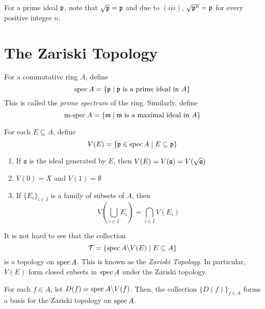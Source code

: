 For a prime ideal $\mathfrak p$, note that $\sqrt{\mathfrak p} = \mathfrak p$ and due to $(iii)$, $\sqrt{\mathfrak p^n} = \mathfrak p$ for every positive integer $n$. 

\section{The Zariski Topology}

\begin{definition}
    For a commutative ring $A$, define 
    \begin{equation*}
        \operatorname{spec} A = \{\mathfrak p\mid\mathfrak p\text{ is a prime ideal in }A\}
    \end{equation*}
    This is called the \textit{prime spectrum} of the ring. Similarly, define 
    \begin{equation*}
        \operatorname{m-spec} A = \{\mathfrak m\mid\mathfrak m\text{ is a maximal ideal in } A\}
    \end{equation*}
\end{definition}

For each $E\subseteq A$, define 
\begin{equation*}
    V(E) = \{\mathfrak p\in\operatorname{spec} A\mid E\subseteq\mathfrak p\}
\end{equation*}

\begin{proposition}
\begin{enumerate}[label=(\alph*)]
    \item If $\mathfrak a$ is the ideal generated by $E$, then $V(E) = V(\mathfrak a) = V(\sqrt{\mathfrak a})$
    \item $V(0) = X$ and $V(1) = \emptyset$ 
    \item If $\{E_i\}_{i\in I}$ is a family of subsets of $A$, then 
    \begin{equation*}
        V\left(\bigcup_{i\in I}E_i\right) = \bigcap_{i\in I}V(E_i)
    \end{equation*}
\end{enumerate}
\end{proposition}

It is not hard to see that the collection 
\begin{equation*}
    \mathcal T = \{\operatorname{spec} A\backslash V(E)\mid E\subseteq A\}
\end{equation*}
is a topology on $\operatorname{spec} A$. This is known as the \textit{Zariski Topology}. In particular, $V(E)$ form closed subsets in $\operatorname{spec} A$ under the Zariski topology. 

\begin{proposition}
    For each $f\in A$, let $D(f) = \operatorname{spec} A\backslash V(f)$. Then, the collection $\{D(f)\}_{f\in A}$ forms a basis for the Zariski topology on $\operatorname{spec} A$.
\end{proposition}

